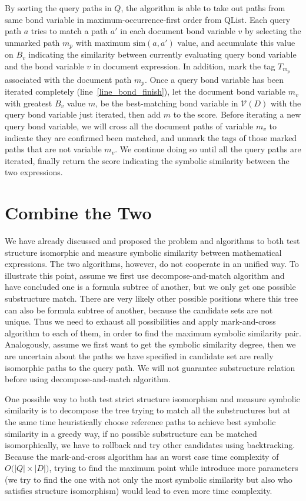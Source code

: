 By sorting the query paths in $Q$, the algorithm is able to take out paths from same bond variable in maximum-occurrence-first order from QList. 
Each query path $a$ tries to match a path $a'$ in each document bond variable $v$ by selecting the unmarked path $m_p$ with maximum $\mathrm{sim}(a,a')$ value, and accumulate this value on $B_v$ indicating the similarity between currently evaluating query bond variable and the bond variable $v$ in document expression.
In addition, mark the tag $T_{m_p}$ associated with the document path $m_p$.
Once a query bond variable has been iterated completely (line~\ref{line_bond_finish}),
let the document bond variable $m_v$ with greatest $B_v$ value $m$, be the best-matching bond variable in $\mathcal{V}(D)$ with the query bond variable just iterated, then add $m$ to the score.
Before iterating a new query bond variable, we will cross all the document paths of variable $m_v$ to indicate they are confirmed been matched, 
and unmark the tags of those marked paths that are not variable $m_v$.
We continue doing so until all the query paths are iterated, finally return the score indicating the symbolic similarity between the two expressions.

\section{Combine the Two}
We have already discussed and proposed the problem and algorithms to both test structure isomorphic and measure symbolic similarity between mathematical expressions. The two algorithms, however, do not cooperate in an unified way. 
To illustrate this point, assume we first use decompose-and-match algorithm and have concluded one is a formula subtree of another, but we only get one possible substructure match. 
There are very likely other possible positions where this tree can also be formula subtree of another, because the candidate sets are not unique. 
Thus we need to exhaust all possibilities and apply mark-and-cross algorithm to each of them, in order to find the maximum symbolic similarity pair. 
Analogously, assume we first want to get the symbolic similarity degree, then we are uncertain about the paths we have specified in candidate set are really isomorphic paths to the query path. 
We will not guarantee substructure relation before using decompose-and-match algorithm.

One possible way to both test strict structure isomorphism and measure symbolic similarity is to decompose the tree trying to match all the substructures but at the same time heuristically choose reference paths to achieve best symbolic similarity in a greedy way, if no possible substructure can be matched isomorphically, we have to rollback and try other candidates using backtracking.
Because the mark-and-cross algorithm has an worst case time complexity of $O\big(|Q| \times |D|\big)$,
trying to find the maximum point while introduce more parameters (we try to find the one with not only the most symbolic similarity but also who satisfies structure isomorphism) would lead to even more time complexity. 

